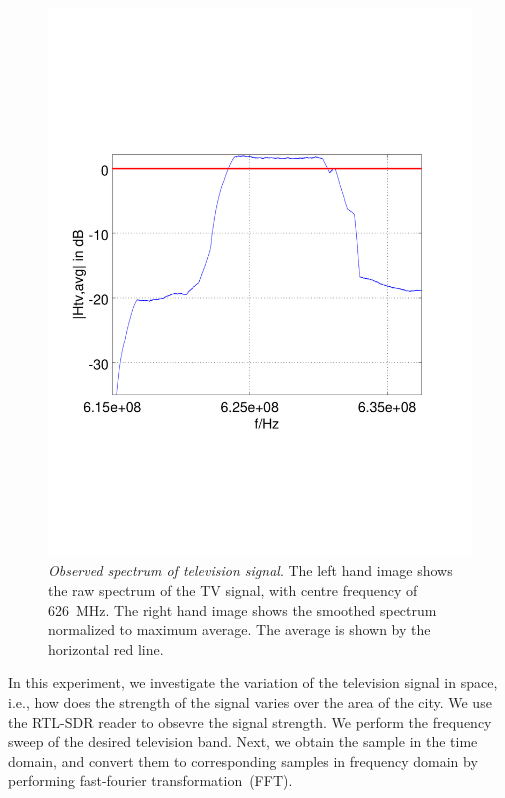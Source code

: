 \begin{figure}[h]
\begin{minipage}{0.49\columnwidth}
	\includegraphics[width=\columnwidth]{./fig/626mhz_filtered}
	\end{minipage}
	\vspace{-6mm}
	\caption{\emph{Observed spectrum of television signal}. The left hand image shows the raw spectrum of the TV signal, with centre frequency of \SI{626}{\mega\hertz}. The right hand image shows the smoothed spectrum normalized to maximum average. The average is  shown by the horizontal red line.}
	\label{fig:tv_record} 
		\vspace{-6mm}
\end{figure}

In this experiment, we investigate the variation of the television signal
in space, i.e., how does the strength of the signal varies over 
the area of the city. We use the RTL-SDR reader to obsevre the signal strength.
We perform the frequency sweep of the desired television band. Next, we
obtain the sample in the time domain, and convert them to corresponding
samples in frequency domain by performing fast-fourier transformation~(FFT).

